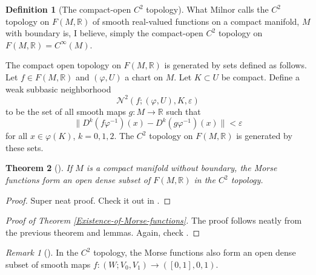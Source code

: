 \documentclass[reqno]{amsart}
\newtheorem{theorem}{Theorem}[section]
\theoremstyle{definition}
\newtheorem{definition}[theorem]{Definition}
\theoremstyle{remark}
\newtheorem*{remark}{Remark}
\begin{document}
   \begin{definition}[The compact-open $C^2$ topology]
       \cite[p. 34]{Hirsch}
       What Milnor calls the $C^2$ topology
       on $F \left( M, \mathbb{R} \right) $ of smooth
       real-valued functions on a compact manifold,
       $M$ with boundary is, I believe,
       simply the compact-open $C^2$ topology on
       $F \left( M, \mathbb{R} \right)=
       C^{\infty}(M)$.

       The compact open topology on
       $F \left( M, \mathbb{R} \right) $ is generated
       by sets defined as follows. Let
       $f \in F \left( M, \mathbb{R} \right) $ and
       $\left( \varphi ,U \right) $ a chart on
       $M$. Let $K \subset U$ be compact. Define a weak
       subbasic neighborhood
       \[
       \mathcal{N}^2 \left( f; \left( \varphi ,U \right) ,
       K, \varepsilon\right) 
       \] 
       to be the set of all
       smooth maps $g \colon M \to \mathbb{R}$ such that
        \[
       \| D^{k}\left( f \varphi^{-1} \right) (x)
       - D^{k}\left( g \varphi^{-1} \right) (x)\|< \varepsilon
       \] 
       for all $x \in \varphi (K)$, $k = 0, 1,2$.
       The $C^2$ topology on
       $F \left( M, \mathbb{R} \right) $ is generated
       by these sets.
   \end{definition}


   \begin{theorem}[]
       If $M$ is a compact manifold without boundary,
       the Morse functions form an open
       dense subset of
       $F \left( M, \mathbb{R} \right) $ in the
       $C^2$ topology.
   \end{theorem}

   \begin{proof}
       Super neat proof. Check it out in \cite{Milnor-h-cobordism}.
   \end{proof}


   \begin{proof}[Proof of Theorem \ref{Existence-of-Morse-functions}]
       The proof follows neatly
       from the previous theorem and lemmas. Again,
       check \cite{Milnor-h-cobordism}.
   \end{proof}

   \begin{remark}[]
       In the $C^2$ topology, the Morse functions also
       form an open dense subset of smooth
       maps
       $f \colon \left( W; V_0, V_1 \right) \to 
       \left( \left[ 0,1 \right] , 0, 1 \right) $.
   \end{remark}
\end{document}
